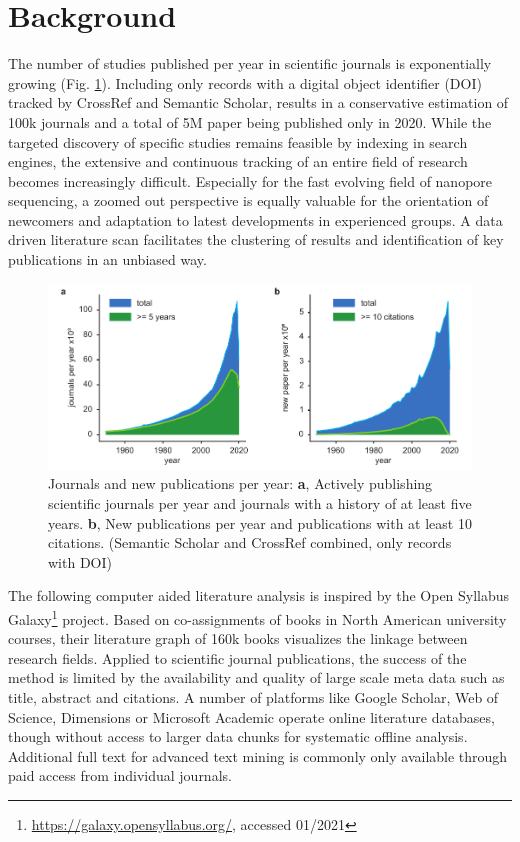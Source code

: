 \section{Background}
\label{sec:state_of_art:background}

The number of studies published per year in scientific journals is exponentially growing (Fig. \ref{fig:state_of_art:paper_count}).
Including only records with a digital object identifier (DOI) tracked by CrossRef and Semantic Scholar, results in a conservative estimation of 100k journals and a total of 5M paper being published only in 2020.
While the targeted discovery of specific studies remains feasible by indexing in search engines, the extensive and continuous tracking of an entire field of research becomes increasingly difficult.
Especially for the fast evolving field of nanopore sequencing, a zoomed out perspective is equally valuable for the orientation of newcomers and adaptation to latest developments in experienced groups.
A data driven literature scan facilitates the clustering of results and identification of key publications in an unbiased way.


\begin{figure}[h]
	\centering
	\includegraphics[width=1.0\textwidth]{figures/state_of_art/paper_count.pdf}
	\captionsetup{format=plain}
	\caption[Journals and publications per year]{Journals and new publications per year: \textbf{a}, Actively publishing scientific journals per year and journals with a history of at least five years. \textbf{b}, New publications per year and publications with at least 10 citations. (Semantic Scholar and CrossRef combined, only records with DOI)}
	\label{fig:state_of_art:paper_count}
\end{figure}

The following computer aided literature analysis is inspired by the Open Syllabus Galaxy\footnote{\url{https://galaxy.opensyllabus.org/}, accessed 01/2021} project.
Based on co-assignments of books in North American university courses, their literature graph of 160k books visualizes the linkage between research fields.
Applied to scientific journal publications, the success of the method is limited by the availability and quality of large scale meta data such as title, abstract and citations.
A number of platforms like Google Scholar, Web of Science, Dimensions or Microsoft Academic operate online literature databases, though without access to larger data chunks for systematic offline analysis.
Additional full text for advanced text mining is commonly only available through paid access from individual journals.




